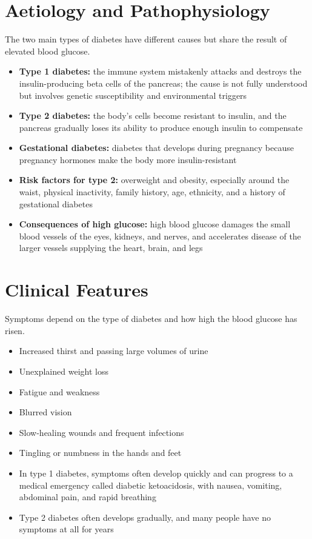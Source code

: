 \section*{Aetiology and Pathophysiology}
The two main types of diabetes have different causes but share the result of elevated blood glucose.
\begin{itemize}
    \item \textbf{Type 1 diabetes:} the immune system mistakenly attacks and destroys the insulin-producing beta cells of the pancreas; the cause is not fully understood but involves genetic susceptibility and environmental triggers
    \item \textbf{Type 2 diabetes:} the body's cells become resistant to insulin, and the pancreas gradually loses its ability to produce enough insulin to compensate
    \item \textbf{Gestational diabetes:} diabetes that develops during pregnancy because pregnancy hormones make the body more insulin-resistant
    \item \textbf{Risk factors for type 2:} overweight and obesity, especially around the waist, physical inactivity, family history, age, ethnicity, and a history of gestational diabetes
    \item \textbf{Consequences of high glucose:} high blood glucose damages the small blood vessels of the eyes, kidneys, and nerves, and accelerates disease of the larger vessels supplying the heart, brain, and legs
\end{itemize}

\section*{Clinical Features}
Symptoms depend on the type of diabetes and how high the blood glucose has risen.
\begin{itemize}
    \item Increased thirst and passing large volumes of urine
    \item Unexplained weight loss
    \item Fatigue and weakness
    \item Blurred vision
    \item Slow-healing wounds and frequent infections
    \item Tingling or numbness in the hands and feet
    \item In type 1 diabetes, symptoms often develop quickly and can progress to a medical emergency called diabetic ketoacidosis, with nausea, vomiting, abdominal pain, and rapid breathing
    \item Type 2 diabetes often develops gradually, and many people have no symptoms at all for years
\end{itemize}

